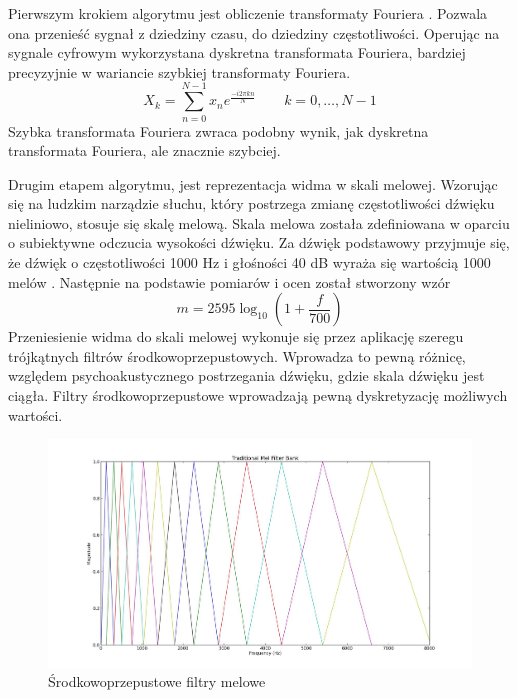 \documentclass[a4paper,12pt,twoside,openany]{report}
\begin{document}
Pierwszym krokiem algorytmu jest obliczenie transformaty Fouriera \cite{Steidl2009}. 
Pozwala ona przenieść sygnał z dziedziny czasu, do dziedziny częstotliwości. 
Operując na sygnale cyfrowym wykorzystana dyskretna transformata Fouriera,
bardziej precyzyjnie w wariancie szybkiej transformaty Fouriera. 
\begin{equation}
	X_{k}=\sum _{n=0}^{N-1}x_{n}e^{\frac{-i2\pi kn}{N}}\qquad k=0,\dots ,N-1
\end{equation}
Szybka transformata Fouriera zwraca podobny wynik, jak dyskretna transformata Fouriera,
ale znacznie szybciej.

Drugim etapem algorytmu, jest reprezentacja widma w skali melowej. 
Wzorując się na ludzkim narządzie słuchu, 
który postrzega zmianę częstotliwości dźwięku nieliniowo, stosuje się skalę melową.
Skala melowa została zdefiniowana w oparciu o subiektywne odczucia wysokości dźwięku.
Za dźwięk podstawowy przyjmuje się, że dźwięk o częstotliwości 1000 Hz i głośności 40 dB wyraża się wartością 1000 melów \cite{KrishnaKishore2013}.
Następnie na podstawie pomiarów i ocen został stworzony wzór
\begin{equation}
	m=2595\log _{10}\left(1+{\frac {f}{700}}\right)
\end{equation}
Przeniesienie widma do skali melowej wykonuje się przez aplikację szeregu trójkątnych filtrów środkowoprzepustowych. 
Wprowadza to pewną różnicę, względem psychoakustycznego postrzegania dźwięku, gdzie skala dźwięku jest ciągła.
Filtry środkowoprzepustowe wprowadzają pewną dyskretyzację możliwych wartości.
\begin{figure}[h]
	\centering
	\includegraphics[width=\textwidth]{melfilterbank}
	\caption{Środkowoprzepustowe filtry melowe}
	\label{rys:mfcc:melfilterbank}
\end{figure}
\end{document}
